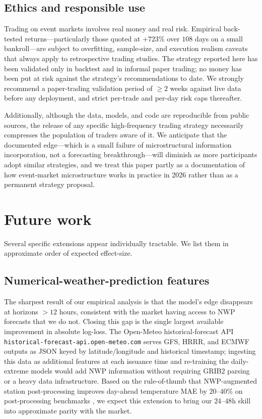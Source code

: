 \documentclass[11pt]{article}
\begin{document}
\subsection{Ethics and responsible use}

Trading on event markets involves real money and real risk. Empirical
back-tested returns---particularly those quoted at $+723\%$ over $108$ days
on a small bankroll---are subject to overfitting, sample-size, and execution
realism caveats that always apply to retrospective trading studies. The
strategy reported here has been validated only in backtest and in informal
paper trading; no money has been put at risk against the strategy's
recommendations to date. We strongly recommend a paper-trading validation
period of $\ge 2$ weeks against live data before any deployment, and
strict per-trade and per-day risk caps thereafter.

Additionally, although the data, models, and code are reproducible from
public sources, the release of any specific high-frequency trading strategy
necessarily compresses the population of traders aware of it. We anticipate
that the documented edge---which is a small failure of microstructural
information incorporation, not a forecasting breakthrough---will diminish
as more participants adopt similar strategies, and we treat this paper
partly as a documentation of how event-market microstructure works in
practice in 2026 rather than as a permanent strategy proposal.

\section{Future work}
\label{sec:future-work}

Several specific extensions appear individually tractable. We list them in
approximate order of expected effect-size.

\subsection{Numerical-weather-prediction features}

The sharpest result of our empirical analysis is that the model's edge
disappears at horizons $> 12$ hours, consistent with the market having
access to NWP forecasts that we do not. Closing this gap is the single
largest available improvement in absolute log-loss. The Open-Meteo
historical-forecast API \texttt{historical-forecast-api.open-meteo.com}
serves GFS, HRRR, and ECMWF outputs as JSON keyed by latitude/longitude
and historical timestamp; ingesting this data as additional features at
each issuance time and re-training the daily-extreme models would
add NWP information without requiring GRIB2 parsing or a heavy data
infrastructure. Based on the rule-of-thumb that NWP-augmented station
post-processing improves day-ahead temperature MAE by $20$--$40\%$ on
post-processing benchmarks \citep{rasp2018neural}, we expect this
extension to bring our $24$--$48$h skill into approximate parity with
the market.
\end{document}
